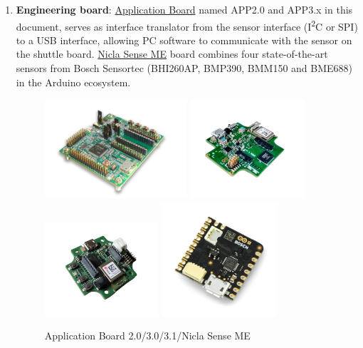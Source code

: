 \documentclass[11pt,headings=small]{scrartcl}
\begin{document}
\begin{enumerate}
	
	\item \textbf{Engineering board}: \href{https://www.bosch-sensortec.com/bst/support_tools/application_boards/overview_application_boards}{Application Board} named APP2.0 and APP3.x in this document, serves as interface translator from the sensor interface (I\textsuperscript{2}C or SPI) to a USB interface, allowing PC software to communicate with the sensor on the shuttle board. \href{https://store.arduino.cc/products/nicla-sense-me}{Nicla Sense ME} board combines four state-of-the-art sensors from Bosch Sensortec (BHI260AP, BMP390, BMM150 and BME688) in the Arduino ecosystem.
	
	\begin{figure}[H]
		\begin{center}
			\includegraphics[width=0.50\textwidth]{coinesAPI_images/APP20-APP20.png}
			\includegraphics[width=0.40\textwidth]{coinesAPI_images/APP30.png}
			\includegraphics[width=0.40\textwidth]{coinesAPI_images/APP31.png}
			\includegraphics[width=0.40\textwidth]{coinesAPI_images/NiclaSenseME.jpg}
			\caption{Application Board 2.0/3.0/3.1/Nicla Sense ME}
		\end{center}
	\end{figure}


\end{enumerate}
\end{document}
